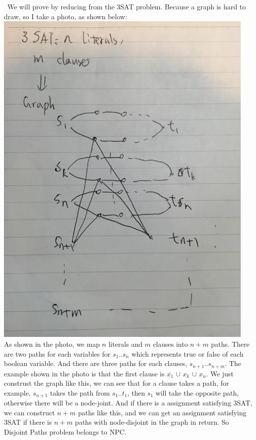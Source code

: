\documentclass[11pt]{article}
\begin{document}
\part{}\
    We will prove by reducing from the 3SAT problem. Because a graph is hard to draw, so I take a photo, as shown below: \\
    \includegraphics[width=5in]{part3}\\
    As shown in the photo, we map $n$ literals and $m$ clauses into $n+m$ paths. There are two paths for each variables for $s_{1}$..$s_{n}$ which represents true or false of each boolean variable. And there are three paths for each clauses, $s_{n+1}$..$s_{n+m}$. 
    The example shown in the photo is that the first clause is $\overline{x_{1}}$ $\cup$ $x_{k}$ $\cup$ $x_{n}$. We just construst the graph like this, we can see that for a clause takes a path, for example, $s_{n+1}$ takes the path from $s_{1}$..$t_{1}$, then $s_{1}$ will take the opposite path, otherwise there will be a node-joint. And if there is a assignment satisfying 3SAT, we can construct $n+m$ paths like this, and we can get an assignment satisfying 3SAT if there is $n+m$ paths with node-disjoint in the graph in return. So Disjoint Paths problem belongs to NPC.
\end{document}
